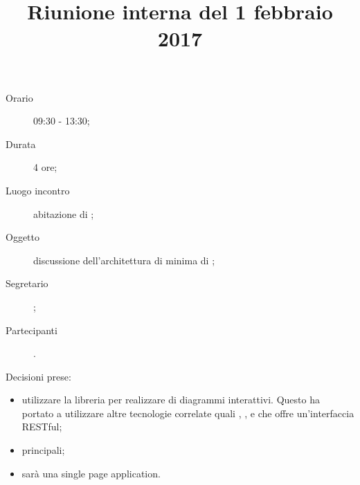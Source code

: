 


\author{\LS}
\supervisor{\LB}
\title{Riunione interna del 1 febbraio 2017}



\maketitle

\begin{description}
	\item[Orario] 09:30 - 13:30;
	\item[Durata] 4 ore;
	\item[Luogo incontro] abitazione di \LS;
	\item[Oggetto] discussione dell'architettura di minima di \proj{};
	\item[Segretario] \LS; 
	\item[Partecipanti] \ALL.
\end{description}
Decisioni prese:
\begin{itemize}
\item utilizzare la libreria \jointjs{} per realizzare  di diagrammi interattivi. Questo ha portato a utilizzare altre tecnologie correlate quali \html{}, \jquery{}, \lodash{} e \backbonejs{} che offre un'interfaccia RESTful;
\item {} principali;
\item \proj{} sarà una single page application.
\end{itemize}

